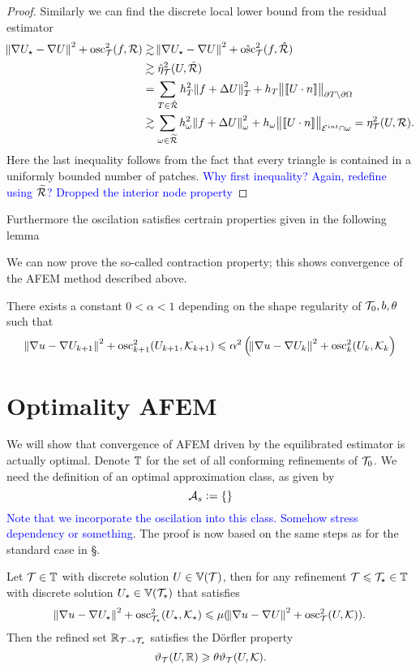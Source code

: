 \documentclass[thesis.tex]{subfiles}
\begin{document}
\begin{proof}
  Similarly we can find the discrete local lower bound from the residual estimator
  \begin{align*}
    \norm{\nabla U_\star - \nabla U}^2 + \operatorname{osc}_{\mathcal{T}}^2(f, \mathcal{R}) &\gtrsim \norm{\nabla U_\star - \nabla U}^2 + \hat{\operatorname{osc}}_{\mathcal{T}}^2(f, \hat {\mathcal{R}}) \\
    &\gtrsim \hat \eta^2_{\mathcal{T}}(U, \hat {\mathcal{R}}) \\
    &= \sum_{T \in \hat {\mathcal{R}}} h_T^2\norm{f + \Delta U}_T^2 + h_T\norm{\llbracket U \cdot n \rrbracket}_{\partial T \setminus \partial \Omega}\\
    &\gtrsim \sum_{\omega \in \widetilde {\mathcal{R}}} h_\omega^2\norm{f + \Delta U}_\omega^2 + h_\omega \norm{\llbracket U \cdot n \rrbracket}_{\mathcal{E}^{int} \cap \omega}= \eta_{\mathcal{T}}^2(U, \mathcal{R}).
  \end{align*}
  Here the last inequality follows from the fact that every triangle is contained in a uniformly bounded number of patches.
  \textcolor{blue}{Why first inequality? Again, redefine using $\widetilde {\mathcal{R}}$? Dropped the interior node property}
\end{proof}
Furthermore the oscilation satisfies certrain properties given in the following lemma
\begin{lem}
  \label{lem:oscasum}

\end{lem}

We can now prove the so-called contraction property; this shows convergence of the AFEM method described above.
\begin{thm}
There exists a constant $0 < \alpha < 1$ depending on the shape regularity of $\mathcal{T}_0, b, \theta$ such that
\[
  \norm{\nabla u - \nabla U_{k+1}}^2 + \operatorname{osc}^2_{k+1}(U_{k+1}, \mathcal{K}_{k+1}) \leqslant \alpha^2\left(\norm{\nabla u - \nabla U_k}^2 + \operatorname{osc}^2_k(U_k, \mathcal{K}_k\right)
\]
\end{thm}


\section{Optimality AFEM}
We will show that convergence of AFEM driven by the equilibrated estimator is actually optimal.
Denote $\mathbb{T}$ for the set of all conforming refinements of $\mathcal{T}_0$. 
We need the definition of an optimal approximation class, as given by
\[
  \mathcal{A}_s := \set{ }
\]
\textcolor{blue}{Note that we incorporate the oscilation into this class. Somehow stress dependency or something}.
The proof is now based on the same steps as for the standard case in \S\cite{sec:afem}.
\begin{lem}
  Let $\mathcal{T} \in \mathbb{T}$ with discrete solution $U \in \mathbb{V}(\mathcal{T})$, then for any refinement $\mathcal{T} \leqslant \mathcal{T}_\star \in \mathbb{T}$ with
  discrete solution $U_\star \in \mathbb{V}(\mathcal{T}_\star)$ that satisfies
  \[
    \norm{\nabla u - \nabla U_\star}^2 + \operatorname{osc}^2_{\mathcal{T}_\star}(U_\star, \mathcal{K}_\star) \leqslant \mu (\norm{\nabla u - \nabla U}^2 + \operatorname{osc}_{\mathcal{T}}^2(U, \mathcal{K})).
  \]
  Then the refined set $\mathbb{R}_{\mathcal{T} \to \mathcal{T}_\star}$ satisfies the D\"orfler property
  \[
    \vartheta_{\mathcal{T}}(U, \mathbb{R}) \geqslant \theta \vartheta_{\mathcal{T}}(U, \mathcal{K}).
  \]
\end{lem}
\end{document}
